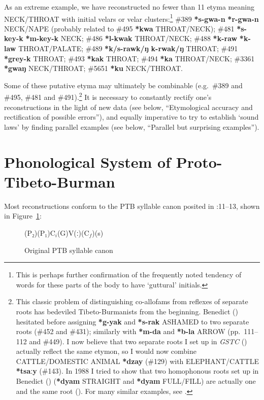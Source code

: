 As an extreme example, we have reconstructed no fewer than 11 etyma meaning NECK/THROAT with initial velars or velar clusters:\footnote{This is perhaps further confirmation of the frequently noted tendency of words for these parts of the body to have ‘guttural’ initials.} \#389 \textbf{*s-gwa-n}  \textbf{*r-gwa-n} NECK/NAPE (probably related to \#495 \textbf{*kwa} THROAT/NECK); \#481 \textbf{*s-key-k}  \textbf{*m-key-k} NECK; \#486 \textbf{*l-kwak} THROAT/NECK; \#488 \textbf{*k-raw}  \textbf{*k-law} THROAT/PALATE; \#489 \textbf{*k/s-rawk/ŋ}  \textbf{k-rwak/ŋ} THROAT; \#491 \textbf{*grey-k} THROAT; \#493 \textbf{*kak} THROAT; \#494 \textbf{*ka} THROAT/NECK; \#3361 \textbf{*gwaŋ} NECK/THROAT; \#5651 \textbf{*ku} NECK/THROAT.

Some of these putative etyma may ultimately be combinable (e.g.\ \#389 and \#495, \#481 and \#491).\footnote{This classic problem of distinguishing co-allofams from reflexes of separate roots has bedeviled Tibeto-Burmanists from the beginning. Benedict (\textit{}) hesitated before assigning \textbf{*g-yak} and \textbf{*s-rak} ASHAMED to two separate roots (\#452 and \#431); similarly with \textbf{*m-da} and \textbf{*b-la} ARROW (pp.~111–112 and \#449). I now believe that two separate roots I set up in \textit{GSTC} (\citealt{JAM-GSTC}) actually reflect the same etymon, so I would now combine CATTLE/DOMESTIC ANIMAL \textbf{*dzay} (\#129) with ELEPHANT/CATTLE \textbf{*tsaːy} (\#143). In 1988 I tried to show that two homophonous roots set up in Benedict (\textit{}) (\textbf{*dyam} STRAIGHT and \textbf{*dyam} FULL/FILL) are actually one and the same root (\citealt{JAM-USAI}). For many similar examples, see \citealt{JAM-RGPJ}.} It is necessary to constantly rectify one’s reconstructions in the light of new data (see below, “Etymological accuracy and rectification of possible errors”), and equally imperative to try to establish ‘sound laws’ by finding parallel examples (see below, “Parallel but surprising examples”).

\section{Phonological System of Proto-Tibeto-Burman}


Most reconstructions conform to the PTB syllable canon posited in \textit{}:11–13, shown in Figure~\ref{fig:PTB_canon_orig}:

\begin{figure}[h!]
\centering
(P₂)\hspace{2em}(P₁)\hspace{2em}$\textrm{C}_i$\hspace{2em}(G)\hspace{2em}V\hspace{2em}(ː)\hspace{2em}($\textrm{C}_f$)\hspace{2em}(s)
\caption{Original PTB syllable canon}
\label{fig:PTB_canon_orig}
\end{figure}

